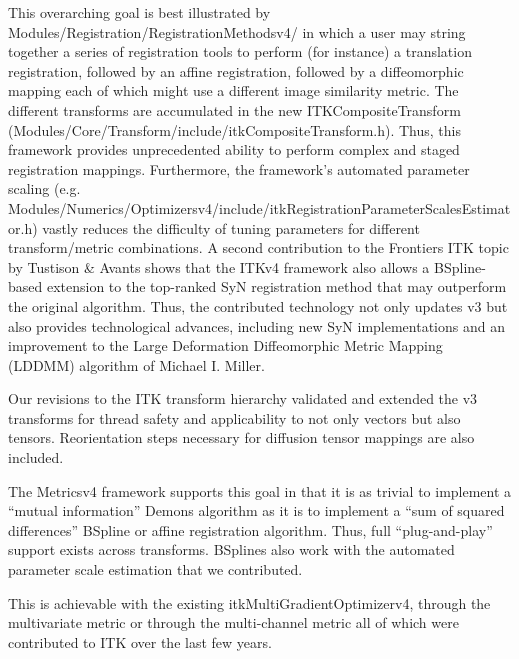 \documentclass{frontiersSCNS}
\begin{document}
This overarching goal is best illustrated by
Modules/Registration/RegistrationMethodsv4/ in which a user may string
together a series of registration tools to perform (for instance) a
translation registration, followed by an affine registration, followed
by a diffeomorphic mapping each of which might use a different image
similarity metric.  The different transforms are accumulated in the
new ITKCompositeTransform
(Modules/Core/Transform/include/itkCompositeTransform.h).  Thus, this
framework provides unprecedented ability to perform complex and staged
registration mappings.  Furthermore, the framework’s automated
parameter scaling
(e.g. Modules/Numerics/Optimizersv4/include/itkRegistrationParameterScalesEstimator.h)
vastly reduces the difficulty of tuning parameters for different
transform/metric combinations.  A second contribution to the Frontiers
ITK topic by Tustison \& Avants shows that the ITKv4 framework also allows a BSpline-based extension to the top-ranked SyN registration method that may outperform the original algorithm.  Thus, the contributed technology not only updates v3 but also provides technological advances, including new SyN implementations and an improvement to the Large Deformation Diffeomorphic Metric Mapping (LDDMM) algorithm of Michael I. Miller.  


Our revisions to the ITK transform hierarchy validated and extended the v3 transforms for thread safety and applicability to not only vectors but also tensors.  Reorientation steps necessary for diffusion tensor mappings are also included.   

The Metricsv4 framework supports this goal in that it is as trivial to
implement a “mutual information” Demons algorithm as it is to
implement a “sum of squared differences” BSpline or affine
registration algorithm.  Thus, full “plug-and-play” support exists
across transforms.   BSplines also work with the automated parameter scale estimation that we contributed.  

This is achievable with the existing itkMultiGradientOptimizerv4,
through the multivariate metric or through the multi-channel metric
all of which were contributed to ITK over the last few years.
\end{document}
